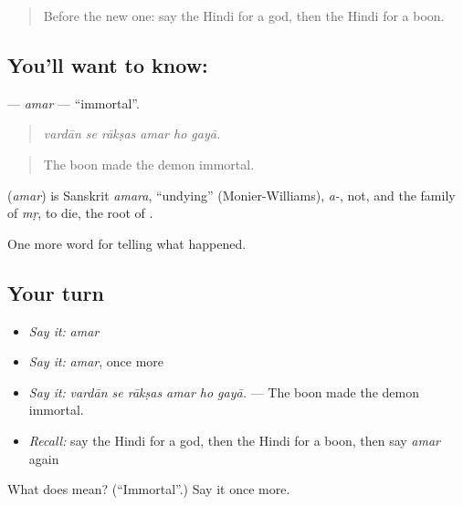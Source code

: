 \begin{quote}
Before the new one: say the Hindi for a god, then the Hindi for a boon.
\end{quote}

\subsection*{You'll want to know: }
\textbf{} — \emph{amar} — \textquotedblleft{}immortal\textquotedblright{}.

\begin{quote}
     
\end{quote}

\begin{quote}
\emph{vardān se rākṣas amar ho gayā.}
\end{quote}

\begin{quote}
The boon made the demon immortal.
\end{quote}

\begin{cousinweb}
\textbf{} (\emph{amar}) is Sanskrit \emph{amara}, \textquotedblleft{}undying\textquotedblright{} (Monier-Williams), \emph{a-}, not, and the family of \emph{mṛ}, to die, the root of \textbf{}.
\end{cousinweb}

\begin{grammarlens}[title={What you've built}]
One more word for telling what happened.
\end{grammarlens}

\subsection*{Your turn}
\begin{itemize}
\raggedright
  \item \emph{Say it:} \emph{amar}
  \item \emph{Say it:} \emph{amar}, once more
  \item \emph{Say it:} \emph{vardān se rākṣas amar ho gayā.} — The boon made the demon immortal.
  \item \emph{Recall:} say the Hindi for a god, then the Hindi for a boon, then say \emph{amar} again
\end{itemize}

\begin{tcolorbox}[breakable,colback=teal!4,colframe=teal!35!black,title={Before you move on}]
What does  mean? (\textquotedblleft{}Immortal\textquotedblright{}.) Say it once more.
\end{tcolorbox}
